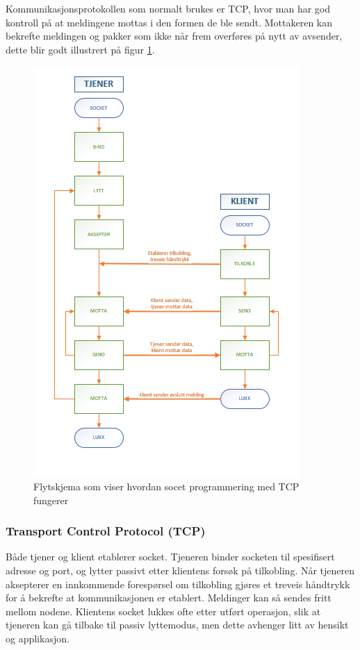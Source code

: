 \documentclass[conference]{IEEEtran}
\begin{document}
        Kommunikasjonsprotokollen som normalt brukes er TCP, hvor man har god kontroll på at meldingene mottas i den formen de ble sendt. Mottakeren 
        kan bekrefte meldingen og pakker som ikke når frem overføres på nytt av avsender, dette blir godt illustrert på figur \ref{fig:socket}.
        \begin{figure}
            \centering
            \includegraphics[width=.8\linewidth]{images/socket_flytskjema.png}
            \caption{Flytskjema som viser hvordan socet programmering med TCP fungerer}
            \label{fig:socket}
        \end{figure}
        \subsubsection{Transport Control Protocol (TCP)}
            Både tjener og klient etablerer socket. Tjeneren binder socketen til spesifisert adresse og port, og lytter passivt etter klientens 
            forsøk på tilkobling. Når tjeneren aksepterer en innkommende forespørsel om tilkobling gjøres et treveis håndtrykk for å bekrefte at 
            kommunikasjonen er etablert. Meldinger kan så sendes fritt mellom nodene. Klientens socket lukkes ofte etter utført operasjon, slik at 
            tjeneren kan gå tilbake til passiv lyttemodus, men dette avhenger litt av hensikt og applikasjon.
    
\end{document}
